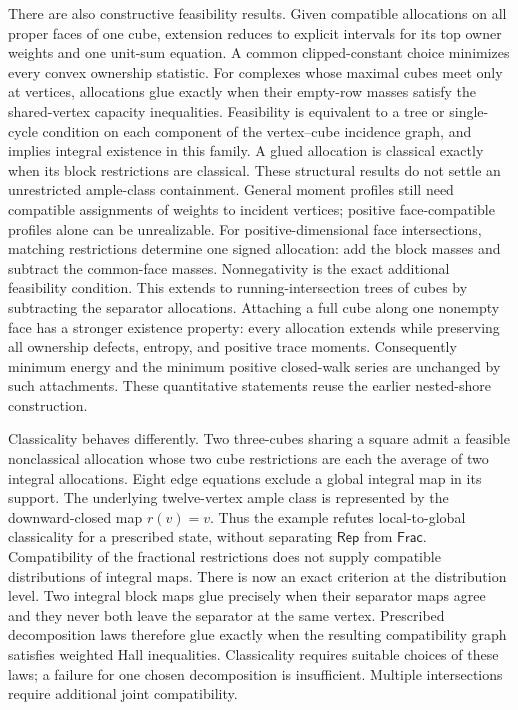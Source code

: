 \documentclass[11pt]{article}
\theoremstyle{definition}
\newcommand{\Rep}{\mathsf{Rep}}
\newcommand{\Frac}{\mathsf{Frac}}
\begin{document}
There are also constructive feasibility results. Given compatible
allocations on all proper faces of one cube, extension reduces to explicit
intervals for its top owner weights and one unit-sum equation. A common
clipped-constant choice minimizes every convex ownership statistic.
For complexes whose maximal cubes meet only at vertices, allocations glue
exactly when their empty-row masses satisfy the shared-vertex capacity
inequalities. Feasibility is equivalent to a tree or single-cycle condition
on each component of the vertex--cube incidence graph, and implies integral
existence in this family. A glued allocation is classical exactly when
its block restrictions are classical. These structural results do not
settle an unrestricted ample-class containment. General moment profiles
still need compatible assignments of weights to incident vertices;
positive face-compatible profiles alone can be unrealizable.
For positive-dimensional face intersections, matching restrictions determine
one signed allocation: add the block masses and subtract the common-face
masses. Nonnegativity is the exact additional feasibility condition. This
extends to running-intersection trees of cubes by subtracting the separator
allocations. Attaching a full cube along one nonempty face has a stronger
existence property: every allocation extends while preserving all ownership
defects, entropy, and positive trace moments. Consequently minimum energy and
the minimum positive closed-walk series are unchanged by such attachments.
These quantitative statements reuse the earlier nested-shore construction.

Classicality behaves differently. Two three-cubes sharing a square admit a
feasible nonclassical allocation whose two cube restrictions are each the
average of two integral allocations. Eight edge equations exclude a global
integral map in its support. The underlying twelve-vertex ample class is
represented by the downward-closed map $r(v)=v$. Thus the example refutes
local-to-global classicality for a prescribed state, without separating
$\Rep$ from $\Frac$. Compatibility of the fractional restrictions does not
supply compatible distributions of integral maps.
There is now an exact criterion at the distribution level. Two integral
block maps glue precisely when their separator maps agree and they never
both leave the separator at the same vertex. Prescribed decomposition laws
therefore glue exactly when the resulting compatibility graph satisfies
weighted Hall inequalities. Classicality requires suitable choices of these
laws; a failure for one chosen decomposition is insufficient. Multiple
intersections require additional joint compatibility.
\end{document}

